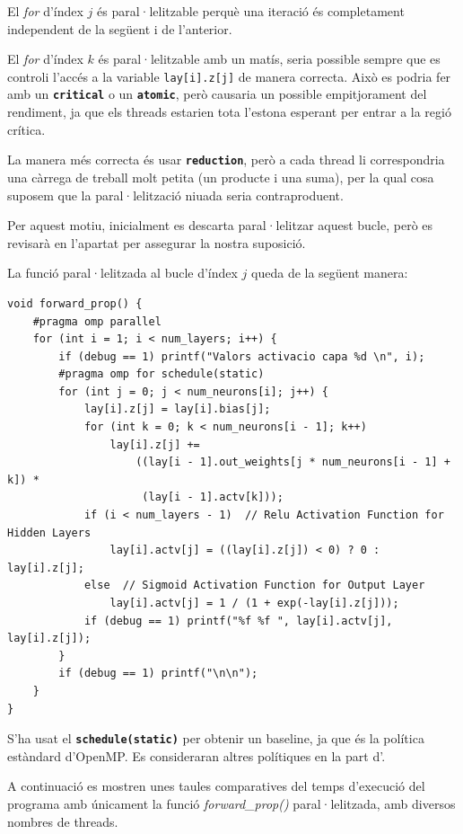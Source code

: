 \documentclass{article}
\begin{document}
El \textit{for} d'índex $j$ és paral·lelitzable perquè una iteració és completament independent de la següent i de l'anterior. 

El \textit{for} d'índex $k$ és paral·lelitzable amb un matís, seria possible sempre que es controli l'accés a la variable \texttt{lay[i].z[j]} de manera correcta. Això es podria fer amb un \textbf{\texttt{critical}} o un \textbf{\texttt{atomic}}, però causaria un possible empitjorament del rendiment, ja que els threads estarien tota l'estona esperant per entrar a la regió crítica.

La manera més correcta és usar \textbf{\texttt{reduction}}, però a cada thread li correspondria una càrrega de treball molt petita (un producte i una suma), per la qual cosa suposem que la paral·lelització niuada seria contraproduent.

Per aquest motiu, inicialment es descarta paral·lelitzar aquest bucle, però es revisarà en l'apartat \texttt{} per assegurar la nostra suposició.

La funció paral·lelitzada al bucle d'índex $j$ queda de la següent manera:
\begin{lstlisting}
void forward_prop() {
    #pragma omp parallel
    for (int i = 1; i < num_layers; i++) {
        if (debug == 1) printf("Valors activacio capa %d \n", i);
        #pragma omp for schedule(static)
        for (int j = 0; j < num_neurons[i]; j++) {
            lay[i].z[j] = lay[i].bias[j];
            for (int k = 0; k < num_neurons[i - 1]; k++)
                lay[i].z[j] +=
                    ((lay[i - 1].out_weights[j * num_neurons[i - 1] + k]) *
                     (lay[i - 1].actv[k]));
            if (i < num_layers - 1)  // Relu Activation Function for Hidden Layers
                lay[i].actv[j] = ((lay[i].z[j]) < 0) ? 0 : lay[i].z[j];
            else  // Sigmoid Activation Function for Output Layer
                lay[i].actv[j] = 1 / (1 + exp(-lay[i].z[j]));
            if (debug == 1) printf("%f %f ", lay[i].actv[j], lay[i].z[j]);
        }
        if (debug == 1) printf("\n\n");
    }
}
\end{lstlisting}

S'ha usat el \textbf{\texttt{schedule(static)}} per obtenir un baseline, ja que és la política estàndard d'OpenMP. Es consideraran altres polítiques en la part d'\texttt{}.

A continuació es mostren unes taules comparatives del temps d'execució del programa amb únicament la funció \textit{forward\_prop()} paral·lelitzada, amb diversos nombres de threads.
\end{document}
